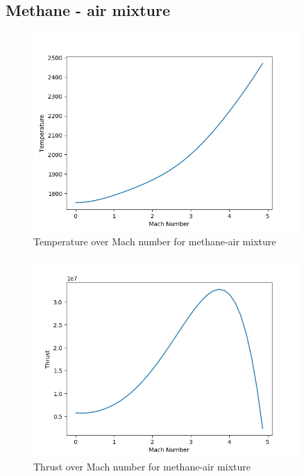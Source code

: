 \documentclass[a4paper,11pt]{article}
\begin{document}
\subsection{Methane - air mixture}
	\begin{figure}[H]
		\centering
       		\includegraphics[width=0.9\textwidth]{metan_pow(1mol)/Temperature_over_Mach.png}
       		\caption{Temperature over Mach number for methane-air mixture}
	\end{figure}
	\begin{figure}[H]
		\centering
		\includegraphics[width=0.9\textwidth]{metan_pow(1mol)/Thrust_over_Mach.png}
       		\caption{Thrust over Mach number for methane-air mixture}
	\end{figure}
\end{document}
